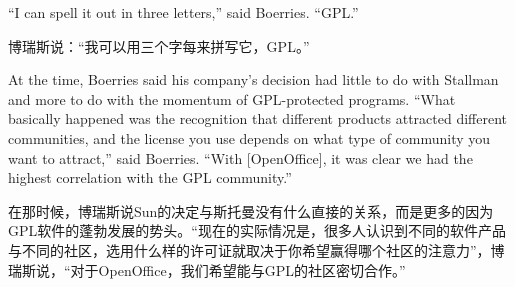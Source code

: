 

\ifdefined\eng
``I can spell it out in three letters,'' said Boerries. ``GPL.''
\fi

\ifdefined\chs
博瑞斯说：``我可以用三个字每来拼写它，GPL。''
\fi

\ifdefined\eng
At the time, Boerries said his company's decision had little to do with Stallman and more to do with the momentum of GPL-protected programs. ``What basically happened was the recognition that different products attracted different communities, and the license you use depends on what type of community you want to attract,'' said Boerries. ``With [OpenOffice], it was clear we had the highest correlation with the GPL community.''  %
\fi

\ifdefined\chs
在那时候，博瑞斯说Sun的决定与斯托曼没有什么直接的关系，而是更多的因为GPL软件的蓬勃发展的势头。``现在的实际情况是，很多人认识到不同的软件产品与不同的社区，选用什么样的许可证就取决于你希望赢得哪个社区的注意力''，博瑞斯说，``对于OpenOffice，我们希望能与GPL的社区密切合作。''%
\fi

